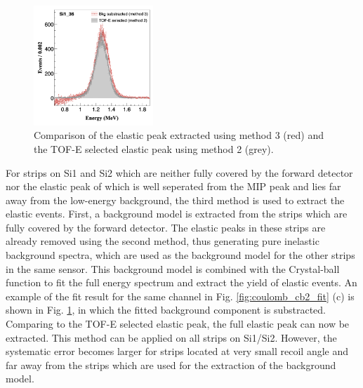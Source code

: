 \documentclass[fleqn,twocolumn,a4paper]{ikpar}
\begin{document}
\begin{figure}[h!]
  \centering
	\includegraphics[width=0.4\textwidth]{./bkg_vs_tofe.png}
  \caption{Comparison of the elastic peak extracted using method 3 (red) and
    the TOF-E selected elastic peak using method 2 (grey).}
  \label{fig:bkg_vs_tofe}
\end{figure}


\par
\medskip

For strips on Si1 and Si2 which are neither fully covered by the forward detector nor
the elastic peak of which is well seperated from the MIP peak and lies
far away from the low-energy background, the third method is used to
extract the elastic events.
First, a background model is extracted from the strips which are fully covered by the forward detector.
The elastic peaks in these strips are already removed using the second method, thus generating 
pure inelastic background spectra, which are used as the background model
for the other strips in the same sensor.
This background model is combined with the Crystal-ball function to fit the full
energy spectrum and extract the yield of elastic events.
An example of the fit result for the same channel in Fig. \ref{fig:coulomb_cb2_fit}
(c) is shown in Fig. \ref{fig:bkg_vs_tofe}, in which the fitted background component is substracted. 
Comparing to the TOF-E selected elastic peak, the full elastic peak can now be extracted.
This method can be applied on all strips on Si1/Si2.
However, the systematic error becomes larger for strips located at very small
recoil angle and far away from the strips which are used for the extraction of the background model.

\par
\medskip
\end{document}
